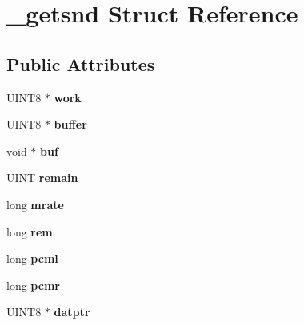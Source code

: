 \hypertarget{struct__getsnd}{\section{\-\_\-getsnd Struct Reference}
\label{struct__getsnd}
}
\subsection*{Public Attributes}
\begin{DoxyCompactItemize}
\item 
\hypertarget{struct__getsnd_add10e3d97e7ccbd90cfb368832e51bf1}{U\-I\-N\-T8 $\ast$ {\bfseries work}}\label{struct__getsnd_add10e3d97e7ccbd90cfb368832e51bf1}

\item 
\hypertarget{struct__getsnd_a38104ba5e8649a70d13655c1d8c6a77d}{U\-I\-N\-T8 $\ast$ {\bfseries buffer}}\label{struct__getsnd_a38104ba5e8649a70d13655c1d8c6a77d}

\item 
\hypertarget{struct__getsnd_a8faab42938b6054823e024ba84e7ecc4}{void $\ast$ {\bfseries buf}}\label{struct__getsnd_a8faab42938b6054823e024ba84e7ecc4}

\item 
\hypertarget{struct__getsnd_a5fdeabf8e8d79721986fdcca33408b94}{U\-I\-N\-T {\bfseries remain}}\label{struct__getsnd_a5fdeabf8e8d79721986fdcca33408b94}

\item 
\hypertarget{struct__getsnd_afbeaf317ab8843a26ad099806bf7fceb}{long {\bfseries mrate}}\label{struct__getsnd_afbeaf317ab8843a26ad099806bf7fceb}

\item 
\hypertarget{struct__getsnd_a59b63135c8ae4486c69567f30ffab7f4}{long {\bfseries rem}}\label{struct__getsnd_a59b63135c8ae4486c69567f30ffab7f4}

\item 
\hypertarget{struct__getsnd_ae83b0cec6f9e8dcba1c64b42b5e4e76e}{long {\bfseries pcml}}\label{struct__getsnd_ae83b0cec6f9e8dcba1c64b42b5e4e76e}

\item 
\hypertarget{struct__getsnd_abf5a3f017fd6bad7bd4ed2313ab3aa75}{long {\bfseries pcmr}}\label{struct__getsnd_abf5a3f017fd6bad7bd4ed2313ab3aa75}

\item 
\hypertarget{struct__getsnd_ad4a16bb85b4836cd9966090593c728fe}{U\-I\-N\-T8 $\ast$ {\bfseries datptr}}\label{struct__getsnd_ad4a16bb85b4836cd9966090593c728fe}


\end{DoxyCompactItemize}

